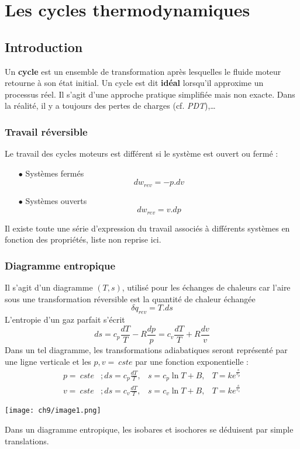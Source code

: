 \chapter{Les cycles thermodynamiques}
\section{Introduction}
Un \textbf{cycle} est un ensemble de transformation après lesquelles 
le fluide moteur retourne à son état initial. Un cycle est dit 
\textbf{idéal} lorsqu'il approxime un processus réel. Il s'agit d'une 
approche pratique simplifiée mais non exacte. Dans la réalité, il y a 
toujours des pertes de charges (cf. \textit{PDT}),\dots

	\subsection{Travail réversible}
	Le travail des cycles moteurs est différent si le système est 
	ouvert ou fermé :
	\begin{itemize}
	\item[$\bullet$] Systèmes fermés 
	\begin{equation}
	dw_{rev} = -p.dv
	\end{equation}
	\item[$\bullet$] Systèmes ouverts
	\begin{equation}
	dw_{rev} = v.dp
	\end{equation}
	\end{itemize}
	Il existe toute une série d'expression du travail associés à différents 
	systèmes en fonction des propriétés, liste non reprise ici.
	
	\subsection{Diagramme entropique}
	Il s'agit d'un diagramme $(T,s)$, utilisé pour les échanges de chaleurs 
	car l'aire sous une transformation réversible est la quantité de chaleur 
	échangée 
	\begin{equation}
	\delta q_{rev} = T.ds
	\end{equation}
	L'entropie d'un gaz parfait s'écrit 
	\begin{equation}
	ds = c_p\dfrac{dT}{T}-R\dfrac{dp}{p} = c_v\dfrac{dT}{T}+R\dfrac{dv}{v}
	\end{equation}
	Dans un tel diagramme, les transformations adiabatiques seront représenté 
	par une ligne verticale et les $p,v=\ cste$ par une fonction exponentielle :
	\begin{equation}
	\begin{array}{llll}
	p =\ cste &; ds = c_p\frac{dT}{T},& s = c_p\ln T + B, & T = ke^{\frac{s}{c_p}}\\
	v =\ cste &; ds = c_v\frac{dT}{T},& s = c_v\ln T + B, & T = ke^{\frac{s}{c_v}}	
	\end{array}
	\end{equation}
	\begin{center}
	\texttt{[image: ch9/image1.png]}
	\end{center}	
	Dans un diagramme entropique, les isobares et isochores se déduisent par simple
	translations.
	
